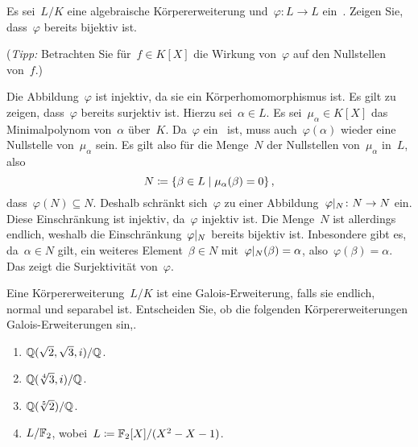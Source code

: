 \documentclass{scrartcl}
\begin{document}
\begin{exercise}
  Es sei~$L/K$ eine algebraische Körpererweiterung und~$\varphi \colon L \to L$ ein~.
  Zeigen Sie, dass~$\varphi$ bereits bijektiv ist.

  (\emph{Tipp:} Betrachten Sie für~$f \in K[X]$ die Wirkung von~$\varphi$ auf den Nullstellen von~$f$.)
\end{exercise}

\begin{solution}
  Die Abbildung~$\varphi$ ist injektiv, da sie ein Körperhomomorphismus ist.
  Es gilt zu zeigen, dass~$\varphi$ bereits surjektiv ist.
  Hierzu sei~$\alpha \in L$.
  Es sei~$\mu_\alpha \in K[X]$ das Minimalpolynom von~$\alpha$ über~$K$.
  Da~$\varphi$ ein~ ist, muss auch~$\varphi(\alpha)$ wieder eine Nullstelle von~$\mu_\alpha$ sein.
  Es gilt also für die Menge~$N$ der Nullstellen von~$\mu_\alpha$ in~$L$, also
  \[
    N
    \defined
    \{
      \beta \in L
    \suchthat
      \mu_\alpha( \beta ) = 0
    \} \,,
  \]
  dass~$\varphi(N) \subseteq N$.
  Deshalb schränkt sich~$\varphi$ zu einer Abbildung~$\restrict{\varphi}{N} \colon N \to N$ ein.
  Diese Einschränkung ist injektiv, da~$\varphi$ injektiv ist.
  Die Menge~$N$ ist allerdings endlich, weshalb die Einschränkung~$\restrict{\varphi}{N}$ bereits bijektiv ist.
  Inbesondere gibt es, da~$\alpha \in N$ gilt, ein weiteres Element~$\beta \in N$ mit~$\restrict{\varphi}{N}(\beta) = \alpha$, also~$\varphi(\beta) = \alpha$.
  Das zeigt die Surjektivität von~$\varphi$.
\end{solution}

\begin{exercise}[subtitle = {Erstklausur~18/19, Erstklausur~19/20}]
  Eine Körpererweiterung~$L/K$ ist eine Galois-Erweiterung, falls sie endlich, normal und separabel ist.
  Entscheiden Sie, ob die folgenden Körpererweiterungen Galois-Erweiterungen sin,.
  \begin{enumerate}
    \item
      $\mathbb{Q}( \sqrt{2}, \sqrt{3}, i ) / \mathbb{Q}$.
    \item
      $\mathbb{Q}(\sqrt[4]{3}, i) / \mathbb{Q}$.
    \item
      $\mathbb{Q}(\sqrt[5]{2}) / \mathbb{Q}$.
    \item
      $L / \mathbb{F}_2$, wobei~$L \coloneqq \mathbb{F}_2[X] / (X^2 - X - 1)$.
  \end{enumerate}
\end{exercise}
\end{document}
